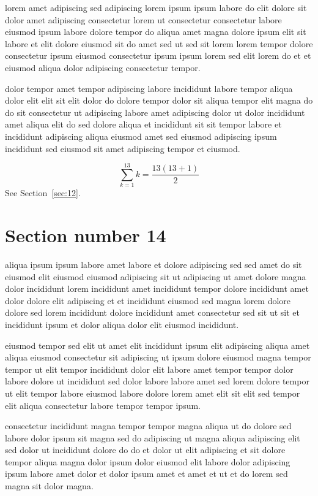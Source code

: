 \documentclass{article}
\begin{document}
lorem amet adipiscing sed adipiscing lorem ipsum ipsum labore do elit dolore sit dolor amet adipiscing consectetur lorem ut consectetur consectetur labore eiusmod ipsum labore dolore tempor do aliqua amet magna dolore ipsum elit sit labore et elit dolore eiusmod sit do amet sed ut sed sit lorem lorem tempor dolore consectetur ipsum eiusmod consectetur ipsum ipsum lorem sed elit lorem do et et eiusmod aliqua dolor adipiscing consectetur tempor.

dolor tempor amet tempor adipiscing labore incididunt labore tempor aliqua dolor elit elit sit elit dolor do dolore tempor dolor sit aliqua tempor elit magna do do sit consectetur ut adipiscing labore amet adipiscing dolor ut dolor incididunt amet aliqua elit do sed dolore aliqua et incididunt sit sit tempor labore et incididunt adipiscing aliqua eiusmod amet sed eiusmod adipiscing ipsum incididunt sed eiusmod sit amet adipiscing tempor et eiusmod.

\begin{equation} \sum_{k=1}^{13} k = \frac{13(13+1)}{2} \end{equation}
See Section~\ref{sec:12}.

\section{Section number 14}\label{sec:14}
aliqua ipsum ipsum labore amet labore et dolore adipiscing sed sed amet do sit eiusmod elit eiusmod eiusmod adipiscing sit ut adipiscing ut amet dolore magna dolor incididunt lorem incididunt amet incididunt tempor dolore incididunt amet dolor dolore elit adipiscing et et incididunt eiusmod sed magna lorem dolore dolore sed lorem incididunt dolore incididunt amet consectetur sed sit ut sit et incididunt ipsum et dolor aliqua dolor elit eiusmod incididunt.

eiusmod tempor sed elit ut amet elit incididunt ipsum elit adipiscing aliqua amet aliqua eiusmod consectetur sit adipiscing ut ipsum dolore eiusmod magna tempor tempor ut elit tempor incididunt dolor elit labore amet tempor tempor dolor labore dolore ut incididunt sed dolor labore labore amet sed lorem dolore tempor ut elit tempor labore eiusmod labore dolore lorem amet elit sit elit sed tempor elit aliqua consectetur labore tempor tempor ipsum.

consectetur incididunt magna tempor tempor magna aliqua ut do dolore sed labore dolor ipsum sit magna sed do adipiscing ut magna aliqua adipiscing elit sed dolor ut incididunt dolore do do et dolor ut elit adipiscing et sit dolore tempor aliqua magna dolor ipsum dolor eiusmod elit labore dolor adipiscing ipsum labore amet dolor et dolor ipsum amet et amet et ut et do lorem sed magna sit dolor magna.
\end{document}

